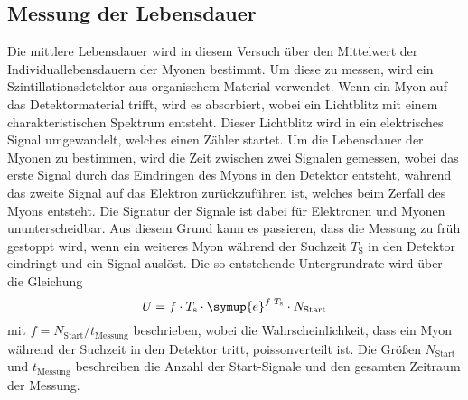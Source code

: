 \subsection{Messung der Lebensdauer}

Die mittlere Lebensdauer wird in diesem Versuch über den Mittelwert der Individuallebensdauern der Myonen bestimmt.
Um diese zu messen,
wird ein Szintillationsdetektor aus organischem Material verwendet.
Wenn ein Myon auf das Detektormaterial trifft,
wird es absorbiert,
wobei ein Lichtblitz mit einem charakteristischen Spektrum entsteht.
Dieser Lichtblitz wird in ein elektrisches Signal umgewandelt,
welches einen Zähler startet.
Um die Lebensdauer der Myonen zu bestimmen,
wird die Zeit zwischen zwei Signalen gemessen,
wobei das erste Signal durch das Eindringen des Myons in den Detektor entsteht,
während das zweite Signal auf das Elektron zurückzuführen ist,
welches beim Zerfall des Myons entsteht.
Die Signatur der Signale ist dabei für Elektronen und Myonen ununterscheidbar.
Aus diesem Grund kann es passieren,
dass die Messung zu früh gestoppt wird,
wenn ein weiteres Myon während der Suchzeit $T_\text{S}$ in den Detektor eindringt und ein Signal auslöst.
Die so entstehende Untergrundrate wird über die Gleichung
\begin{equation*}
    U = f \cdot T_\text{s} \cdot \symup{e}^{f \cdot T_\text{s}} \cdot N_\text{Start}
\end{equation*}
mit $f = {N_\text{Start}} / {t_\text{Messung}}$ beschrieben,
wobei die Wahrscheinlichkeit,
dass ein Myon während der Suchzeit in den Detektor tritt,
poissonverteilt ist.
Die Größen $N_\text{Start}$ und $t_\text{Messung}$ beschreiben die Anzahl der Start-Signale und den gesamten Zeitraum der Messung.
